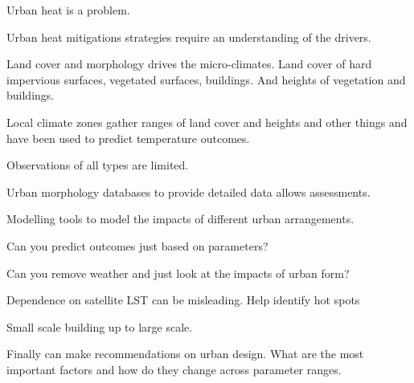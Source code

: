 \documentclass[final,3p,times,authoryear]{elsarticle}
\begin{document}
Urban heat is a problem.

Urban heat mitigations strategies require an understanding of the drivers.

Land cover and morphology drives the micro-climates.
  Land cover of hard impervious surfaces, vegetated surfaces, buildings. And heights of vegetation and buildings.
  
Local climate zones gather ranges of land cover and heights and other things and have been used to predict temperature outcomes.

Observations of all types are limited.

Urban morphology databases to provide detailed data allows assessments.

Modelling tools to model the impacts of different urban arrangements.

Can you predict outcomes just based on parameters?

Can you remove weather and just look at the impacts of urban form?

Dependence on satellite LST can be misleading. \citep{Coutts2016d}
Help identify hot spots

Small scale building up to large scale.

Finally can make recommendations on urban design. What are the most important factors and how do they change across parameter ranges.


\end{document}
